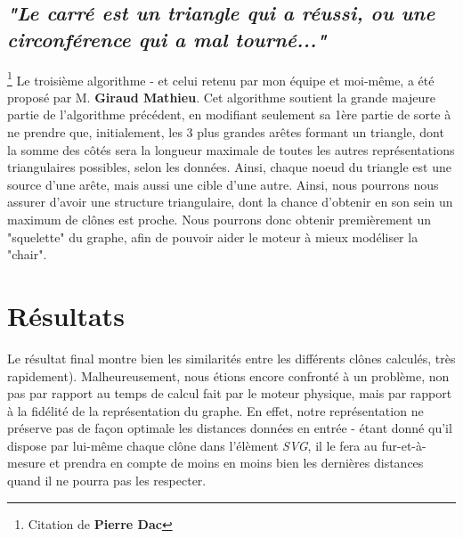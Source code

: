 \documentclass[pdftex,12pt,a4paper]{report}
\begin{document}
\begin{spacing}{1.2}
\subsection{\textit{"Le carré est un triangle qui a réussi, ou une circonférence qui a mal tourné..."}}\footnote{Citation de \textbf{Pierre Dac}}
Le troisième algorithme - et celui retenu par mon équipe et moi-même, a été proposé par M. \textbf{Giraud Mathieu}.
\newline
Cet algorithme soutient la grande majeure partie de l'algorithme précédent, en modifiant seulement sa 1ère partie de sorte à ne prendre que, initialement, les 3 plus grandes arêtes formant un triangle, dont la somme des côtés sera la longueur maximale de toutes les autres représentations triangulaires possibles, selon les données. Ainsi, chaque noeud du triangle est une source d'une arête, mais aussi une cible d'une autre.
\newline
Ainsi, nous pourrons nous assurer d'avoir une structure triangulaire, dont la chance d'obtenir en son sein un maximum de clônes est proche.
\newline
Nous pourrons donc obtenir premièrement un "squelette" du graphe, afin de pouvoir aider le moteur à mieux modéliser la "chair".

\section{Résultats}

Le résultat final montre bien les similarités entre les différents clônes calculés, très rapidement).
\newline
Malheureusement, nous étions encore confronté à un problème, non pas par rapport au temps de calcul fait par le moteur physique, mais par rapport à la fidélité de la représentation du graphe.
En effet, notre représentation ne préserve pas de façon optimale les distances données en entrée - étant donné qu'il dispose par lui-même chaque clône dans l'élèment \textit{SVG}, il le fera au fur-et-à-mesure et prendra en compte de moins en moins bien les dernières distances quand il ne pourra pas les respecter.


\end{spacing}
\end{document}
